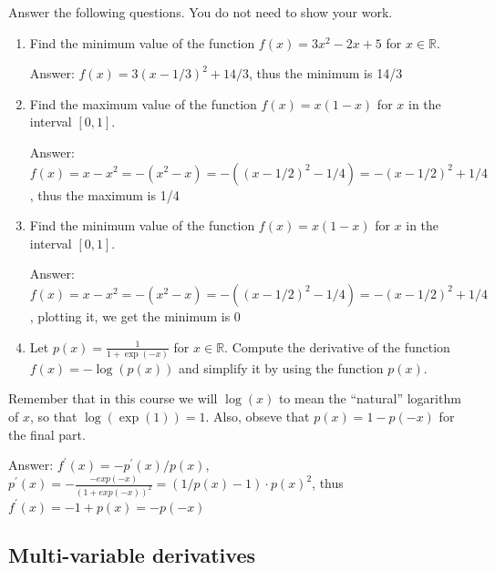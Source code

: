 \documentclass{article}
\def\blu#1{{\color{blu}#1}}
\def\R{\mathbb{R}}
\begin{document}
\blu{Answer the following questions.} You do not need to show your work.

\begin{enumerate}
\item Find the minimum value of the function $f(x) = 3x^2 -2x + 5$ for $x \in \R$.


Answer: $f(x)=3(x-1/3)^2+14/3$, thus the minimum is 14/3


\item Find the maximum value of the function $f(x) = x(1-x)$ for $x$ in the interval $[0,1]$.

Answer: $f(x)=x-x^2=-(x^2-x)=-( (x-1/2)^2-1/4 )=-(x-1/2)^2+1/4 $, thus the maximum is 1/4

\item Find the minimum value of the function $f(x) = x(1-x)$ for $x$ in the interval $[0,1]$.

Answer: $f(x)=x-x^2=-(x^2-x)=-( (x-1/2)^2-1/4 )=-(x-1/2)^2+1/4 $, plotting it, we get the minimum is 0 


\item Let $p(x) = \frac{1}{1+\exp(-x)}$ for $x \in \R$. Compute the derivative of the function $f(x) = -\log(p(x))$ and simplify it by using the function $p(x)$.
\end{enumerate}
Remember that in this course we will $\log(x)$ to mean the ``natural'' logarithm of $x$, so that $\log(\exp(1)) = 1$. Also, obseve that $p(x) = 1-p(-x)$ for the final part.

Answer: $f^{'}(x)=- p^{'}(x)/p(x)$, $p^{'}(x)=-\frac{ -exp(-x)  }{ (1+exp(-x) )^2 }   = (1/p(x) - 1 ) \cdot p(x)^{2} $, thus $f^{'}(x)=-1+p(x)  =  -p(-x) $

\subsection{Multi-variable derivatives}
\end{document}
